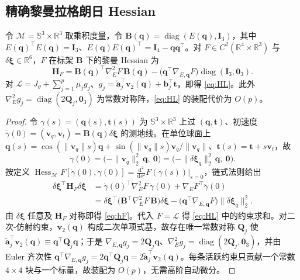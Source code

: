 \subsection{精确黎曼拉格朗日 Hessian}\label{app:hessian}
\begin{lemma}\label{lem:hessian}
令 $\mathcal M=\mathbb S^3\times\mathbb R^3$ 取乘积度量，令 $\mathbf B(\mathbf q)=\operatorname{diag}(E(\mathbf q),\mathbf I_3)$，其中 $E(\mathbf q)^\top E(\mathbf q)=\mathbf I_3$、$E(\mathbf q)E(\mathbf q)^\top=\mathbf I_4-\mathbf q\mathbf q^\top$。对 $F\in C^2(\mathbb R^4\times\mathbb R^3)$ 与 $\delta\boldsymbol\xi\in\mathbb R^6$，$F$ 在标架 $\mathbf B$ 下的黎曼 Hessian 为
\begin{equation}
\mathbf H_F=\mathbf B(\mathbf q)^\top\nabla_E^2F\,\mathbf B(\mathbf q)-\big(\mathbf q^\top\nabla_{E,\mathbf q}F\big)\operatorname{diag}(\mathbf I_3,\mathbf 0_3).
\label{eq:hF}
\end{equation}
对 $\mathcal L=J_\theta+\sum_{j=1}^p\mu_jg_j$、$g_j=\tilde{\mathbf a}_j^\top\mathbf v_2(\mathbf q)+\mathbf b_j^\top\mathbf t$，即得 \eqref{eq:HL}。此外 $\nabla_E^2g_j=\operatorname{diag}(2\mathbf Q_j,\mathbf 0_3)$ 为常数对称阵，\eqref{eq:HL} 的装配代价为 $O(p)$。
\end{lemma}
\begin{proof}
令 $\gamma(s)=(\mathbf q(s),\mathbf t(s))$ 为 $\mathbb S^3\times\mathbb R^3$ 上过 $(\mathbf q,\mathbf t)$、初速度 $\dot\gamma(0)=(\mathbf v_q,\mathbf v_t)=\mathbf B(\mathbf q)\delta\boldsymbol\xi$ 的测地线。在单位球面上 $\mathbf q(s)=\cos(\|\mathbf v_q\|s)\mathbf q+\sin(\|\mathbf v_q\|s)\mathbf v_q/\|\mathbf v_q\|$、$\mathbf t(s)=\mathbf t+s\mathbf v_t$，故
\[
\ddot\gamma(0)=\big(-\|\mathbf v_q\|_2^2\,\mathbf q,\ \mathbf 0\big)=\big(-\|\delta\boldsymbol\xi_q\|_2^2\,\mathbf q,\ \mathbf 0\big).
\]
按定义 $\operatorname{Hess}_{\mathcal M}F[\dot\gamma(0),\dot\gamma(0)]=\frac{\mathrm d^2}{\mathrm ds^2}F(\gamma(s))|_{s=0}$，链式法则给出
\begin{equation}
\begin{aligned}
\delta\boldsymbol\xi^\top\mathbf H_F\delta\boldsymbol\xi
&=\dot\gamma(0)^\top\nabla_E^2F\,\dot\gamma(0)+\nabla_EF^\top\ddot\gamma(0)\\
&=\delta\boldsymbol\xi^\top\big(\mathbf B^\top\nabla_E^2F\,\mathbf B\big)\delta\boldsymbol\xi-\big(\mathbf q^\top\nabla_{E,\mathbf q}F\big)\|\delta\boldsymbol\xi_q\|_2^2 .
\end{aligned}
\end{equation}
由 $\delta\boldsymbol\xi$ 任意及 $\mathbf H_F$ 对称即得 \eqref{eq:hF}。代入 $F=\mathcal L$ 得 \eqref{eq:HL} 中的约束求和。对二次-仿射约束，$\mathbf v_2(\mathbf q)$ 构成二次单项式基，故存在唯一常数对称 $\mathbf Q_j$ 使 $\tilde{\mathbf a}_j^\top\mathbf v_2(\mathbf q)\equiv\mathbf q^\top\mathbf Q_j\mathbf q$；于是 $\nabla_{E,\mathbf q}g_j=2\mathbf Q_j\mathbf q$、$\nabla_E^2g_j=\operatorname{diag}(2\mathbf Q_j,\mathbf 0_3)$，并由 Euler 齐次性 $\mathbf q^\top\nabla_{E,\mathbf q}g_j=2\mathbf q^\top\mathbf Q_j\mathbf q=2\tilde{\mathbf a}_j^\top\mathbf v_2(\mathbf q)$。每条活跃约束只贡献一个常数 $4\times4$ 块与一个标量，故装配为 $O(p)$，无需高阶自动微分。
\end{proof}
